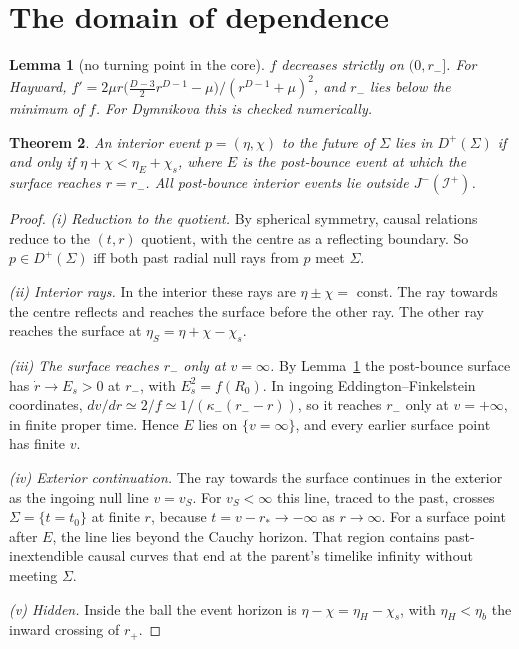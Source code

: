 \documentclass[11pt,a4paper]{article}
\newtheorem{theorem}{Theorem}
\newtheorem{lemma}[theorem]{Lemma}
\theoremstyle{definition}\newtheorem{definition}[theorem]{Definition}
\theoremstyle{remark}\newtheorem{remark}[theorem]{Remark}
\begin{document}
\section{The domain of dependence}
\begin{lemma}[no turning point in the core]\label{lem:core}
$f$ decreases strictly on $(0,r_-]$. For Hayward, $f'=2\mu r\big(\tfrac{D-3}{2}r^{D-1}-\mu\big)/(r^{D-1}+\mu)^2$, and $r_-$ lies below
the minimum of $f$. For Dymnikova this is checked numerically.
\end{lemma}

\begin{theorem}\label{thm:dod}
An interior event $p=(\eta,\chi)$ to the future of $\Sigma$ lies in $D^+(\Sigma)$ if and only if $\eta+\chi<\eta_E+\chi_s$, where $E$ is
the post-bounce event at which the surface reaches $r=r_-$. All post-bounce interior events lie outside $J^-(\mathcal I^+)$.
\end{theorem}
\begin{proof}
\emph{(i) Reduction to the quotient.} By spherical symmetry, causal relations reduce to the $(t,r)$ quotient, with the centre as a
reflecting boundary. So $p\in D^+(\Sigma)$ iff both past radial null rays from $p$ meet $\Sigma$.

\emph{(ii) Interior rays.} In the interior these rays are $\eta\pm\chi=$ const. The ray towards the centre reflects and reaches the
surface before the other ray. The other ray reaches the surface at $\eta_S=\eta+\chi-\chi_s$.

\emph{(iii) The surface reaches $r_-$ only at $v=\infty$.} By Lemma~\ref{lem:core} the post-bounce surface has $\dot r\to E_s>0$ at
$r_-$, with $E_s^2=f(R_0)$. In ingoing Eddington--Finkelstein coordinates, $dv/dr\simeq2/f\simeq1/(\kappa_-(r_--r))$, so it reaches
$r_-$ only at $v=+\infty$, in finite proper time. Hence $E$ lies on $\{v=\infty\}$, and every earlier surface point has finite $v$.

\emph{(iv) Exterior continuation.} The ray towards the surface continues in the exterior as the ingoing null line $v=v_S$. For
$v_S<\infty$ this line, traced to the past, crosses $\Sigma=\{t=t_0\}$ at finite $r$, because $t=v-r_*\to-\infty$ as $r\to\infty$. For
a surface point after $E$, the line lies beyond the Cauchy horizon. That region contains past-inextendible causal curves that end at
the parent's timelike infinity without meeting $\Sigma$.

\emph{(v) Hidden.} Inside the ball the event horizon is $\eta-\chi=\eta_H-\chi_s$, with $\eta_H<\eta_b$ the inward crossing of $r_+$.
\end{proof}
\end{document}
